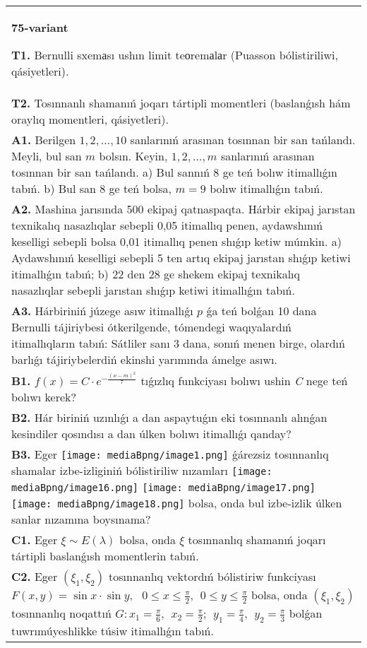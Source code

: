 \documentclass{article}
\begin{document}
\begin{tabular}{m{17cm}}
\textbf{75-variant}
\newline

\textbf{T1.} Bernulli sxemаsı ushın limit teоremаlаr (Puasson bólistiriliwi, qásiyetleri).
 \\
\textbf{T2.} Tosınnanlı shamanıń joqarı tártipli momentleri (baslanǵısh hám oraylıq momentleri, qásiyetleri).
 \\
\textbf{A1.} Berilgen $1,2,\ldots ,10$ sanlarınıń arasınan tosınnan bir san tańlandı. Meyli, bul san $m$ bolsın. Keyin, $1,2,\ldots ,m$ sanlarınıń arasınan tosınnan bir san tańlandı. a) Bul sannıń 8 ge teń bolıw itimallıǵın tabıń. b) Bul san 8 ge teń bolsa, $m=9$ bolıw itimallıǵın tabıń.
 \\
\textbf{A2.} Mashina jarısında 500 ekipaj qatnaspaqta. Hárbir ekipaj jarıstan texnikalıq nasazlıqlar sebepli 0,05 itimallıq penen, aydawshınıń keselligi sebepli bolsa 0,01 itimallıq penen shıǵıp ketiw múmkin. a) Aydawshınıń keselligi sebepli 5 ten artıq ekipaj jarıstan shıǵıp ketiwi itimallıǵın tabıń; b) 22 den 28 ge shekem ekipaj texnikalıq nasazlıqlar sebepli jarıstan shıǵıp ketiwi itimallıǵın tabıń.
 \\
\textbf{A3.} Hárbiriniń júzege asıw itimallıǵı $p$ ǵa teń bolǵan 10 dana Bernulli tájiriybesi ótkerilgende, tómendegi waqıyalardıń itimallıqların tabıń: Sátliler sanı 3 dana, sonıń menen birge, olardıń barlıǵı tájiriybelerdiń ekinshi yarımında ámelge asıwı.
 \\
\textbf{B1.} \(f(x) = C \cdot e^{- \frac{(x - m)^{2}}{7}}\) tıǵızlıq funkciyası bolıwı ushin \emph{C} nege teń bolıwı kerek?
 \\
\textbf{B2.} Hár biriniń uzınlıǵı a dan aspaytuǵın eki tosınnanlı alınǵan kesindiler qosındısı a dan úlken bolıwı itimallıǵı qanday?
 \\
\textbf{B3.} Eger \texttt{[image: mediaBpng/image1.png]} ǵárezsiz tosınnanlıq shamalar izbe-izliginiń bólistiriliw nızamları
\texttt{[image: mediaBpng/image16.png]} \texttt{[image: mediaBpng/image17.png]} \texttt{[image: mediaBpng/image18.png]}
bolsa, onda bul izbe-izlik úlken sanlar nızamına boysınama?
 \\
\textbf{C1.} Eger \(\xi\sim E(\lambda)\) bolsa, onda \(\xi\) tosınnanlıq shamanıń joqarı tártipli baslanǵısh momentlerin tabıń.
 \\
\textbf{C2.} Eger \(\left( \xi_{1},\xi_{2} \right)\) tosınnanlıq vektordıń bólistiriw funkciyası\(F(x,y) = \sin x \cdot \sin y,\ \ \ 0 \leq x \leq \frac{\pi}{2},\ \ 0 \leq y \leq \frac{\pi}{2}\) bolsa, onda \(\left( \xi_{1},\xi_{2} \right)\) tosınnanlıq noqattıń \(G:x_{1} = \frac{\pi}{6},\ \ x_{2} = \frac{\pi}{2};\ \ y_{1} = \frac{\pi}{4},\ \ y_{2} = \frac{\pi}{3}\) bolǵan tuwrımúyeshlikke túsiw itimallıǵın tabıń.

\end{tabular}
\end{document}
